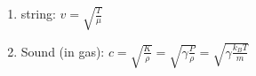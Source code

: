 

\vspace*{\fill}
\centering

\begin{enumerate}
    \item string: $\displaystyle v = \sqrt{\frac{T}{\mu}}$ 
    \item Sound (in gas): $\displaystyle c = \sqrt{\frac{K}{\rho}} = \sqrt{\gamma\frac{P}{\rho}} = \sqrt{\gamma\frac{k_{B}T}{m}}$
\end{enumerate}

\centering
\vspace*{\fill}

